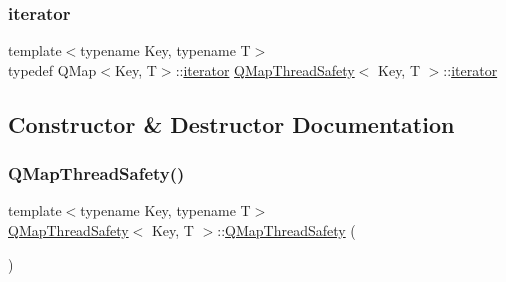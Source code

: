\mbox{\label{class_q_map_thread_safety_a454c8af3f68e6d61aecaf1b918aa525b}} 
\subsubsection{\texorpdfstring{iterator}{iterator}}
{\footnotesize\ttfamily template$<$typename Key, typename T$>$ \\
typedef Q\+Map$<$Key, T$>$\+::\hyperlink{class_q_map_thread_safety_a454c8af3f68e6d61aecaf1b918aa525b}{iterator} \hyperlink{class_q_map_thread_safety}{Q\+Map\+Thread\+Safety}$<$ Key, T $>$\+::\hyperlink{class_q_map_thread_safety_a454c8af3f68e6d61aecaf1b918aa525b}{iterator}}



\subsection{Constructor \& Destructor Documentation}
\mbox{\label{class_q_map_thread_safety_a8fb3ac28b9f65184a844cf76938df0f6}} 
\subsubsection{\texorpdfstring{Q\+Map\+Thread\+Safety()}{QMapThreadSafety()}\hspace{0.1cm}{\footnotesize\ttfamily [1/5]}}
{\footnotesize\ttfamily template$<$typename Key, typename T$>$ \\
\hyperlink{class_q_map_thread_safety}{Q\+Map\+Thread\+Safety}$<$ Key, T $>$\+::\hyperlink{class_q_map_thread_safety}{Q\+Map\+Thread\+Safety} (\begin{DoxyParamCaption}{ }\end{DoxyParamCaption})\hspace{0.3cm}{\ttfamily [default]}}

\mbox{\label{class_q_map_thread_safety_a8b1bc71d8c92c4d01b6b3baae9787bb4}} 
